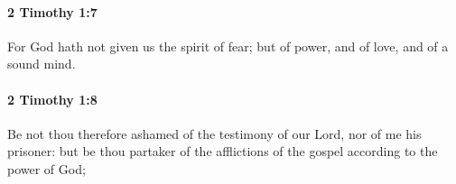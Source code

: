 		\paragraph{2 Timothy 1:7} %
			\label{2TIMOTHY-1-7}

			For God hath not given us the spirit of fear; but of power, and of love, and of a sound mind.

			\begin{framed}
			\scriptsize
				\begin{compactdesc}
					\item[SBLG] 
				\end{compactdesc}
			\end{framed}

		\paragraph{2 Timothy 1:8} %
			\label{2TIMOTHY-1-8}

			Be not thou therefore ashamed of the testimony of our Lord, nor of me his prisoner: but be thou partaker of the afflictions of the gospel according to the power of God;

